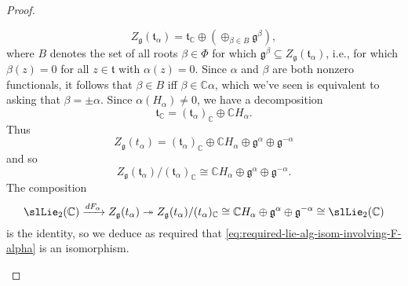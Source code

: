 \documentclass[reqno]{amsart} 
\begin{document}
\begin{proof}
\begin{enumerate}
    \begin{equation*}
      Z_{\mathfrak{g}}(\mathfrak{t}_\alpha)
      = \mathfrak{t}_{\mathbb{C}}
      \oplus (\oplus_{\beta \in B}
      \mathfrak{g}^\beta),
    \end{equation*}
    where $B$ denotes the set of all roots $\beta \in \Phi$ for which $\mathfrak{g}^\beta \subseteq Z_{\mathfrak{g}}(\mathfrak{t}_\alpha)$, i.e., for which $\beta(z) = 0$ for all $z \in \mathfrak{t}$ with $\alpha(z) = 0$.  Since $\alpha$ and $\beta$ are both nonzero functionals, it follows that $\beta \in B$ iff $\beta \in \mathbb{C} \alpha$, which we've seen is equivalent to asking that $\beta = \pm \alpha$.  Since $\alpha(H_\alpha) \neq 0$, we have a decomposition
    \begin{equation}\label{eq:decompose-t-C-via-H-alpha}
      \mathfrak{t}_{\mathbb{C}} =
      (\mathfrak{t}_{\alpha})_{\mathbb{C}}
      \oplus \mathbb{C} H_\alpha.
    \end{equation}
    Thus
    \begin{equation*}
      Z_{\mathfrak{g}}(t_\alpha)
      = (\mathfrak{t}_\alpha)_{\mathbb{C}}
      \oplus \mathbb{C} H_\alpha
      \oplus \mathfrak{g}^{\alpha}
      \oplus \mathfrak{g}^{-\alpha}
    \end{equation*}
    and so
    \begin{equation*}
      Z_{\mathfrak{g}}(\mathfrak{t}_\alpha)
      / (\mathfrak{t}_{\alpha})_{\mathbb{C}}
      \cong
      \mathbb{C} H_\alpha
      \oplus \mathfrak{g}^{\alpha} \oplus \mathfrak{g}^{-\alpha}.
    \end{equation*}
    The composition
    \begin{equation*}
      \slLie_2(\mathbb{C}) \xrightarrow{d F_\alpha }
      Z_{\mathfrak{g}}(t_\alpha)
      \twoheadrightarrow Z_{\mathfrak{g}}(t_\alpha)/
      (t_\alpha)_{\mathbb{C}}
      \cong
      \mathbb{C} H_\alpha
      \oplus \mathfrak{g}^{\alpha} \oplus \mathfrak{g}^{-\alpha}
      \cong \slLie_2(\mathbb{C})
    \end{equation*}
    is the identity, so we deduce as required that \eqref{eq:required-lie-alg-isom-involving-F-alpha} is an isomorphism.
  \end{enumerate}
\end{proof}
\end{document}
